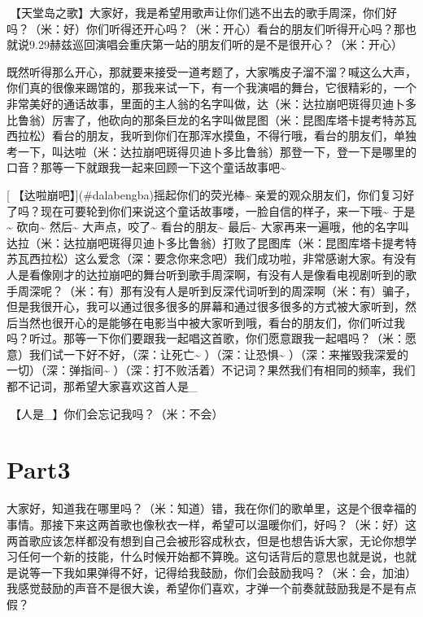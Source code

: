 \documentclass[
]{book}
\begin{document}
🎵【天堂岛之歌】大家好，我是希望用歌声让你们逃不出去的歌手周深，你们好吗？（米：好）你们听得还开心吗？（米：开心）看台的朋友们听得开心吗？那也就说9.29赫兹巡回演唱会重庆第一站的朋友们听的是不是很开心？（米：开心）

既然听得那么开心，那就要来接受一道考题了，大家嘴皮子溜不溜？喊这么大声，你们真的很像来踢馆的，那我来试一下，有一个我演唱的舞台，它很精彩的，一个非常美好的通话故事，里面的主人翁的名字叫做，达（米：达拉崩吧斑得贝迪卜多比鲁翁）厉害了，他砍向的那条巨龙的名字叫做昆图（米：昆图库塔卡提考特苏瓦西拉松）看台的朋友，我听到你们在那浑水摸鱼，不得行哦，看台的朋友们，单独考一下，叫达啦（米：达拉崩吧斑得贝迪卜多比鲁翁）那登一下，登一下是哪里的口音？那等一下就跟我一起来回顾一下这个童话故事吧\textasciitilde{}

[🎵【达啦崩吧】](#dalabengba)摇起你们的荧光棒\textasciitilde{} 亲爱的观众朋友们，你们复习好了吗？现在可要轮到你们来说这个童话故事喽，一脸自信的样子，来一下哦\textasciitilde{} 于是\textasciitilde{} 砍向\textasciitilde{} 然后\textasciitilde{} 大声点，咬了\textasciitilde{} 看台的朋友\textasciitilde{} 最后\textasciitilde{} 大家再来一遍哦，他的名字叫达拉（米：达拉崩吧斑得贝迪卜多比鲁翁）打败了昆图库（米：昆图库塔卡提考特苏瓦西拉松）这么爱念（深：要念你来念吧）我们成功啦，非常感谢大家。有没有人是看像刚才的达拉崩吧的舞台听到歌手周深啊，有没有人是像看电视剧听到的歌手周深呢？（米：有）那有没有人是听到反深代词听到的周深啊（米：有）骗子，但是我很开心，我可以通过很多很多的屏幕和通过很多很多的方式被大家听到，然后当然也很开心的是能够在电影当中被大家听到哦，看台的朋友们，你们听过我吗？听过。那等一下你们要跟我一起唱这首歌，你们愿意跟我一起唱吗？（米：愿意）我们试一下好不好，（深：让死亡\textasciitilde{} ）（深：让恐惧\textasciitilde{} ）（深：来摧毁我深爱的一切）（深：弹指间\textasciitilde{} ）（深：打不败活着）不记词？果然我们有相同的频率，我们都不记词，那希望大家喜欢这首人是\_

🎵【人是\_】你们会忘记我吗？（米：不会）

\section{Part3}\label{chongqing-20241006-part3}

大家好，知道我在哪里吗？（米：知道）错，我在你们的歌单里，这是个很幸福的事情。那接下来这两首歌也像秋衣一样，希望可以温暖你们，好吗？（米：好）这两首歌应该怎样都没有想到自己会被形容成秋衣，但是也想告诉大家，无论你想学习任何一个新的技能，什么时候开始都不算晚。这句话背后的意思也就是说，也就是说等一下我如果弹得不好，记得给我鼓励，你们会鼓励我吗？（米：会，加油）我感觉鼓励的声音不是很大诶，希望你们喜欢，才弹一个前奏就鼓励我是不是有点假？
\end{document}
